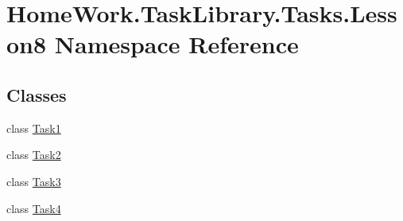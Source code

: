\hypertarget{namespace_home_work_1_1_task_library_1_1_tasks_1_1_lesson8}{}\section{Home\+Work.\+Task\+Library.\+Tasks.\+Lesson8 Namespace Reference}
\label{namespace_home_work_1_1_task_library_1_1_tasks_1_1_lesson8}
\subsection*{Classes}
\begin{DoxyCompactItemize}
\item 
class \mbox{\hyperlink{class_home_work_1_1_task_library_1_1_tasks_1_1_lesson8_1_1_task1}{Task1}}
\item 
class \mbox{\hyperlink{class_home_work_1_1_task_library_1_1_tasks_1_1_lesson8_1_1_task2}{Task2}}
\item 
class \mbox{\hyperlink{class_home_work_1_1_task_library_1_1_tasks_1_1_lesson8_1_1_task3}{Task3}}
\item 
class \mbox{\hyperlink{class_home_work_1_1_task_library_1_1_tasks_1_1_lesson8_1_1_task4}{Task4}}
\end{DoxyCompactItemize}
